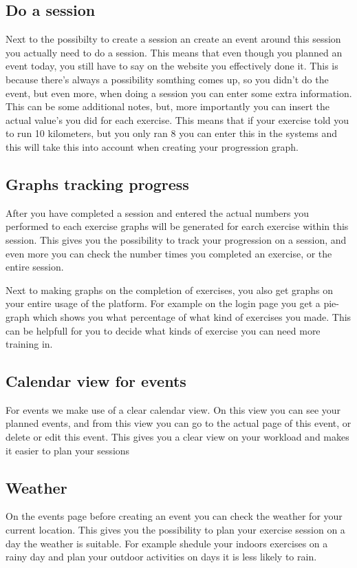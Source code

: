 \documentclass[11pt,a4paper]{scrartcl}
\begin{document}
\subsection{Do a session}
Next to the possibilty to create a session an create an event around this session you
actually need to do a session. This means that even though you planned an event
today, you still have to say on the website you effectively done it. This is because
there's always a possibility somthing comes up, so you didn't do the event, but even
more, when doing a session you can enter some extra information. This can be some
additional notes, but, more importantly you can insert the actual value's you did for each
exercise. This means that if your exercise told you to run 10 kilometers, but you only
ran 8 you can enter this in the systems and this will take this into account when creating
your progression graph.
\subsection{Graphs tracking progress}
After you have completed a session and entered the actual numbers you performed to
each exercise graphs will be generated for earch exercise within this session. This gives
you the possibility to track your progression on a session, and even more you can check
the number times you completed an exercise, or the entire session.

Next to making graphs on the completion of exercises, you also get graphs on your
entire usage of the platform. For example on the login page you get a pie-graph which
shows you what percentage of what kind of exercises you made. This can be helpfull for
you to decide what kinds of exercise you can need more training in.

\subsection{Calendar view for events}
For events we make use of a clear calendar view. On this view you can see your planned
events, and from this view you can go to the actual page of this event, or delete or edit
this event. This gives you a clear view on your workload and makes it easier to plan
your sessions

\subsection{Weather}
On the events page before creating an event you can check the weather for your current
location. This gives you the possibility to plan your exercise session on a day the
weather is suitable. For example shedule your indoors exercises on a rainy day and plan
your outdoor activities on days it is less likely to rain.
\end{document}
